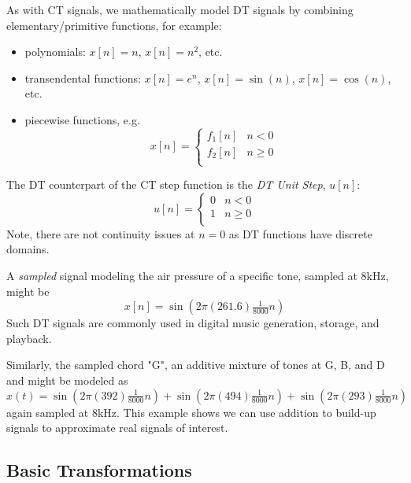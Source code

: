 As with CT signals, we mathematically model DT signals by combining elementary/primitive functions, for example:  
\begin{itemize}
\item polynomials: $x[n] = n$, $x[n] = n^2$, etc.
\item transendental functions: $x[n] = e^n$, $x[n] = \sin(n)$, $x[n] = \cos(n)$, etc.
\item piecewise functions, e.g.
\[
x[n] = \left\{  \begin{array}{cl}
f_1[n] & n < 0\\
f_2[n] & n \geq 0\\
\end{array}\right.
\]
\end{itemize}

\begin{example}
  The DT counterpart of the CT step function is the \emph{DT Unit Step}, $u[n]$:
  \[
  u[n] = \left\{  \begin{array}{cl}
    0 & n < 0\\
    1 & n \geq 0\\
  \end{array}\right.
  \]
  Note, there are not continuity issues at $n=0$ as DT functions have discrete domains.
\end{example}

\begin{example}
  A \emph{sampled} signal modeling the air pressure of a specific tone, sampled at 8kHz, might be 
  \[
  x[n] = \sin\left(2\pi (261.6) \tfrac{1}{8000} n\right)
  \]
  Such DT signals are commonly used in digital music generation, storage, and playback.
\end{example}
\begin{example}
    Similarly, the sampled chord "G", an additive mixture of tones at G, B, and D and might be modeled as
    \[
    x(t) = \sin\left(2\pi (392) \tfrac{1}{8000} n\right) + \sin\left(2\pi (494) \tfrac{1}{8000} n\right) + \sin\left(2\pi (293) \tfrac{1}{8000} n\right) 
    \]
    again sampled at 8kHz. This example shows we can use addition to build-up signals to approximate real signals of interest.
\end{example}

\subsection{Basic Transformations}

